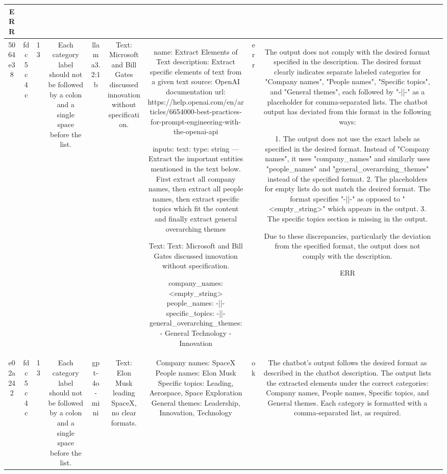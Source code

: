 \begin{table}[h!]
\begin{tabular}{|c|c|c|c|c|c|c|c|c|c|}
ERR & \\
\hline
5064e38 & fdc5c4c & 13 & Each category label should not be followed by a colon and a single space before the list. & llama3.2:1b & Text: Microsoft and Bill Gates discussed innovation without specification. & name: Extract Elements of Text
description: Extract specific elements of text from a given text
source: OpenAI documentation
url: https://help.openai.com/en/articles/6654000-best-practices-for-prompt-engineering-with-the-openai-api

inputs:
  text:
    type: string
---
Extract the important entities mentioned in the text below. First extract all company names, then extract all people names, then extract specific topics which fit the content and finally extract general overarching themes

Text: Text: Microsoft and Bill Gates discussed innovation without specification.

company_names: <empty_string>
people_names: -||-
specific_topics: -||-
general_overarching_themes:
  - General Technology
  - Innovation & err & The output does not comply with the desired format specified in the description. The desired format clearly indicates separate labeled categories for "Company names", "People names", "Specific topics", and "General themes", each followed by "-||-" as a placeholder for comma-separated lists. The chatbot output has deviated from this format in the following ways:

1. The output does not use the exact labels as specified in the desired format. Instead of "Company names", it uses "company_names" and similarly uses "people_names" and "general_overarching_themes" instead of the specified format.
2. The placeholders for empty lists do not match the desired format. The format specifies "-||-" as opposed to "<empty_string>" which appears in the output.
3. The specific topics section is missing in the output.

Due to these discrepancies, particularly the deviation from the specified format, the output does not comply with the description.

ERR & \\
\hline
e02a242 & fdc5c4c & 13 & Each category label should not be followed by a colon and a single space before the list. & gpt-4o-mini & Text: Elon Musk leading SpaceX, no clear formats. & Company names: SpaceX
People names: Elon Musk
Specific topics: Leading, Aerospace, Space Exploration
General themes: Leadership, Innovation, Technology & ok & The chatbot's output follows the desired format as described in the chatbot description. The output lists the extracted elements under the correct categories: Company names, People names, Specific topics, and General themes. Each category is formatted with a comma-separated list, as required.


\end{tabular}
\end{table}
